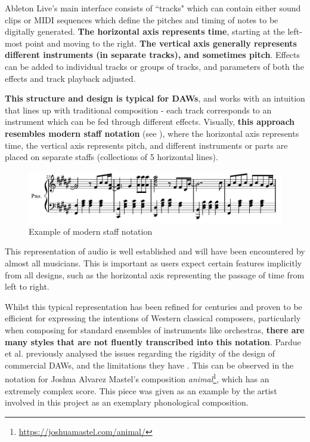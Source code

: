 \documentclass[12pt,a4paper,oneside,openright]{report}
\begin{document}
Ableton Live's main interface consists of ``tracks" which can contain either sound clips or MIDI sequences which define the pitches and timing of notes to be digitally generated. \textbf{The horizontal axis represents time}, starting at the left-most point and moving to the right. \textbf{The vertical axis generally represents different instruments (in separate tracks), and sometimes pitch}. Effects can be added to individual tracks or groups of tracks, and parameters of both the effects and track playback adjusted. 

\textbf{This structure and design is typical for DAWs}, and works with an intuition that lines up with traditional composition - each track corresponds to an instrument which can be fed through different effects. Visually, \textbf{this approach resembles modern staff notation} (see ), where the horizontal axis represents time, the vertical axis represents pitch, and different instruments or parts are placed on separate staffs (collections of 5 horizontal lines).

\begin{figure}[h]
    \centering
    \includegraphics[scale=0.7]{images/modern staff notation.png}
    \caption{Example of modern staff notation}
    \label{fig:staff_not}
\end{figure}

This representation of audio is well established and will have been encountered by almost all musicians. This is important as users expect certain features implicitly from all designs, such as the horizontal axis representing the passage of time from left to right.

Whilst this typical representation has been refined for centuries and proven to be efficient for expressing the intentions of Western classical composers, particularly when composing for standard ensembles of instruments like orchestras, \textbf{there are many styles that are not fluently transcribed into this notation}. Pardue et al. previously analysed the issues regarding the rigidity of the design of commercial DAWs, and the limitations they have \cite{Pardue22}. This can be observed in the notation for Joshua Alvarez Mastel's composition \textit{animal}\footnote{\url{https://joshuamastel.com/animal/}}, which has an extremely complex score. This piece was given as an example by the artist involved in this project as an exemplary phonological composition.
\end{document}

